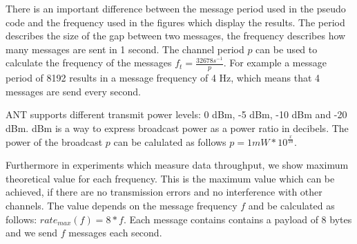There is an important difference between the message period used in the pseudo code and the frequency used in the figures which display the results. The period describes the size of the gap between two messages, the frequency describes how many messages are sent in 1 second. The channel period $p$ can be used to calculate the frequency of the messages $f_t = \frac{32678s^{-1}}{p}$. For example a message period of 8192 results in a message frequency of 4 Hz, which means that 4 messages are send every second.

ANT supports different transmit power levels: 0 dBm, -5 dBm, -10 dBm and -20 dBm. dBm is a way to express broadcast power as a power ratio in decibels. The power of the broadcast $p$ can be calulated as follows $p = 1mW * 10^{\frac{x}{10}}$.

Furthermore in experiments which measure data throughput, we show maximum theoretical value for each frequency. This is the maximum value which can be achieved, if there are no transmission errors and no interference with other channels. The value depends on the message frequency $f$ and be calculated as follows: $rate_{max}(f) = 8*f$. Each message contains contains a payload of 8 bytes and we send $f$ messages each second.
\newpage

